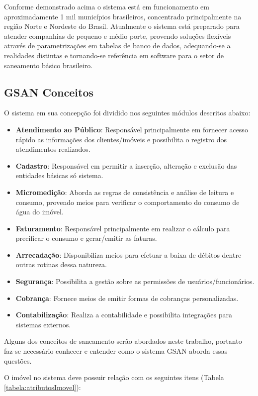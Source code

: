 Conforme demonstrado acima o sistema está em funcionamento em aproximadamente 1 mil municípios brasileiros, concentrado principalmente na região Norte e Nordeste do Brasil.
Atualmente o sistema está preparado para atender companhias de pequeno e médio porte, provendo soluções flexíveis através de parametrizações em tabelas de banco de dados, adequando-se a realidades distintas e tornando-se referência em software para o setor de saneamento básico brasileiro. 

\subsection{\textbf{GSAN Conceitos}}

O sistema em sua concepção foi dividido nos seguintes módulos descritos abaixo:
\begin{itemize}
\item \textbf{Atendimento ao Público}: Responsável principalmente em fornecer acesso rápido as informações dos clientes/imóveis e possibilita o registro dos atendimentos realizados.
\item \textbf{Cadastro}: Responsável em permitir a inserção, alteração e exclusão das entidades básicas só sistema.
\item \textbf{Micromedição}: Aborda as regras de consistência e análise de leitura e consumo, provendo meios para verificar o comportamento do consumo de água do imóvel.
\item \textbf{Faturamento}: Responsável principalmente em realizar o cálculo para precificar o consumo e gerar/emitir as faturas.
\item \textbf{Arrecadação}: Disponibiliza meios para efetuar a baixa de débitos dentre outras rotinas dessa natureza.
\item \textbf{Segurança}: Possibilita a gestão sobre as permissões de usuários/funcionários.
\item \textbf{Cobrança}: Fornece meios de emitir formas de cobranças personalizadas.
\item \textbf{Contabilização}: Realiza a contabilidade e possibilita integrações para sistemas externos.
\end{itemize}

Alguns dos conceitos de saneamento serão abordados neste trabalho, portanto faz-se necessário conhecer e entender como o sistema GSAN aborda essas questões.

O imóvel no sistema deve possuir relação com os seguintes itens (Tabela \ref{tabela:atributosImovel}):

